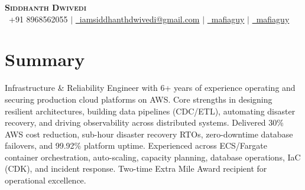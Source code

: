 \documentclass[letterpaper,11pt]{article}
\begin{document}
\begin{center}
    \textbf{\Huge \scshape Siddhanth Dwivedi} \\ \vspace{1pt}
    \small
    \faPhone\ +91 8968562055 $|$
    \href{mailto:iamsiddhanthdwivedi@gmail.com}{\faEnvelope\ iamsiddhanthdwivedi@gmail.com} $|$
    \href{https://github.com/mafiaguy}{\faGithub\ mafiaguy} $|$
    \href{https://linkedin.com/in/mafiaguy}{\faLinkedin\ mafiaguy}
\end{center}

\section{Summary}
\small{Infrastructure \& Reliability Engineer with 6+ years of experience operating and securing production cloud platforms on AWS. Core strengths in designing resilient architectures, building data pipelines (CDC/ETL), automating disaster recovery, and driving observability across distributed systems. Delivered 30\% AWS cost reduction, sub-hour disaster recovery RTOs, zero-downtime database failovers, and 99.92\% platform uptime. Experienced across ECS/Fargate container orchestration, auto-scaling, capacity planning, database operations, IaC (CDK), and incident response. Two-time Extra Mile Award recipient for operational excellence.}

\end{document}
